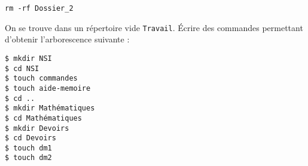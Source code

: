 \documentclass[a4paper,dvipsnames]{article}
\newenvironment{correction}{\color{blue}}{}
\begin{document}
\begin{exercice}[breakable]{}{}
\begin{enumerate}
      \begin{correction}
	\begin{center}
	  \texttt{rm -rf Dossier_2}
	\end{center}  
      \end{correction}

  \end{enumerate}
\end{exercice}

\smallskip

\begin{exercice}{}{}
  On se trouve dans un répertoire vide \texttt{Travail}. Écrire des commandes permettant d'obtenir l'arborescence suivante :
  
  \bigskip


  \begin{correction}
      \begin{verbatim}
$ mkdir NSI
$ cd NSI
$ touch commandes
$ touch aide-memoire
$ cd ..
$ mkdir Mathématiques
$ cd Mathématiques
$ mkdir Devoirs
$ cd Devoirs
$ touch dm1
$ touch dm2
      \end{verbatim}
  \end{correction}
  

\end{exercice}
\end{document}
